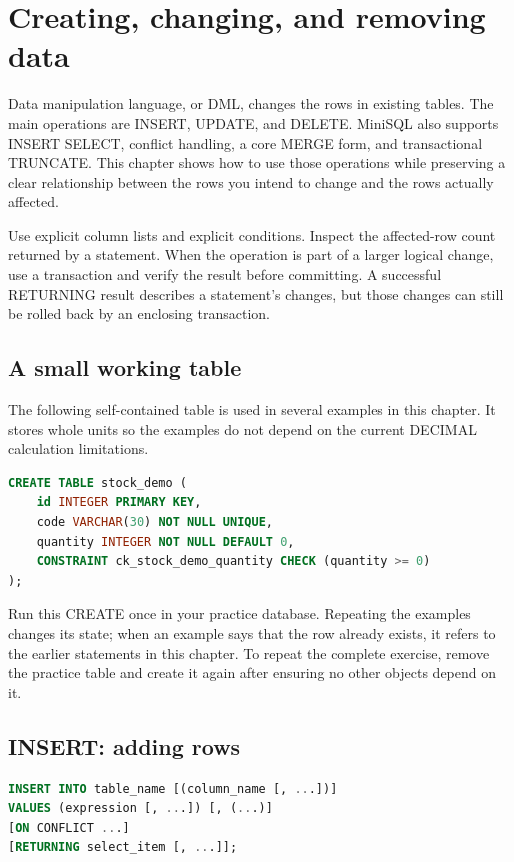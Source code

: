 \chapter{Creating, changing, and removing data}
\label{sql:dml}

Data manipulation language, or DML, changes the rows in existing tables. The main operations are INSERT, UPDATE, and DELETE. MiniSQL also supports INSERT SELECT, conflict handling, a core MERGE form, and transactional TRUNCATE. This chapter shows how to use those operations while preserving a clear relationship between the rows you intend to change and the rows actually affected.

Use explicit column lists and explicit conditions. Inspect the affected-row count returned by a statement. When the operation is part of a larger logical change, use a transaction and verify the result before committing. A successful RETURNING result describes a statement's changes, but those changes can still be rolled back by an enclosing transaction.

\section{A small working table}

The following self-contained table is used in several examples in this chapter. It stores whole units so the examples do not depend on the current DECIMAL calculation limitations.

\begin{lstlisting}[language=SQL]
CREATE TABLE stock_demo (
    id INTEGER PRIMARY KEY,
    code VARCHAR(30) NOT NULL UNIQUE,
    quantity INTEGER NOT NULL DEFAULT 0,
    CONSTRAINT ck_stock_demo_quantity CHECK (quantity >= 0)
);
\end{lstlisting}

Run this CREATE once in your practice database. Repeating the examples changes its state; when an example says that the row already exists, it refers to the earlier statements in this chapter. To repeat the complete exercise, remove the practice table and create it again after ensuring no other objects depend on it.

\section{INSERT: adding rows}

\begin{lstlisting}[language=SQL]
INSERT INTO table_name [(column_name [, ...])]
VALUES (expression [, ...]) [, (...)]
[ON CONFLICT ...]
[RETURNING select_item [, ...]];
\end{lstlisting}

